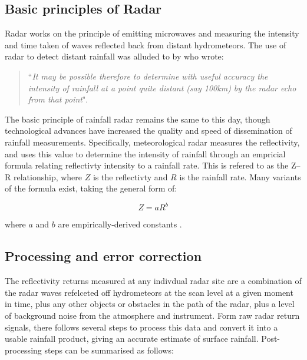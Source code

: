 \subsection{Basic principles of Radar}

Radar works on the principle of emitting microwaves and measuring the intensity and time taken of waves reflected back from distant hydrometeors. The use of radar to detect distant rainfall was alluded to by \citet{marshall1947measurement} who wrote: 

\begin{quotation} 
``\textit{It may be possible therefore to determine with useful accuracy the intensity of rainfall at a point quite distant (say 100km) by the radar echo from that point}".
\end{quotation}

The basic principle of rainfall radar remains the same to this day, though technological advances have increased the quality and speed of dissemination of rainfall measurements. Specifically, meteorological radar measures the reflectivity, and uses this value to determine the intensity of rainfall through an empricial formula relating reflectivty intensity to a rainfall rate. This is refered to as the Z--R relationship, where \(Z\) is the reflectivty and \(R\) is the rainfall rate. Many variants of the formula exist, taking the general form of:
  
\begin{equation}
Z = aR^b
\end{equation}

where \(a\) and \(b\) are empirically-derived constants \citep{gunn1949terminal,joss1969raindrop}.

\subsection{Processing and error correction}

The reflectivity returns measured at any indivdual radar site are a combination of the radar waves refelceted off hydrometeors at the scan level at a given moment in time, plus any other objects or obstacles in the path of the radar, plus a level of background noise from the atmosphere and instrument. Form raw radar return signals, there follows several steps to process this data and convert it into a usable rainfall product, giving an accurate estimate of surface rainfall. Post-processing steps can be summarised as follows:

